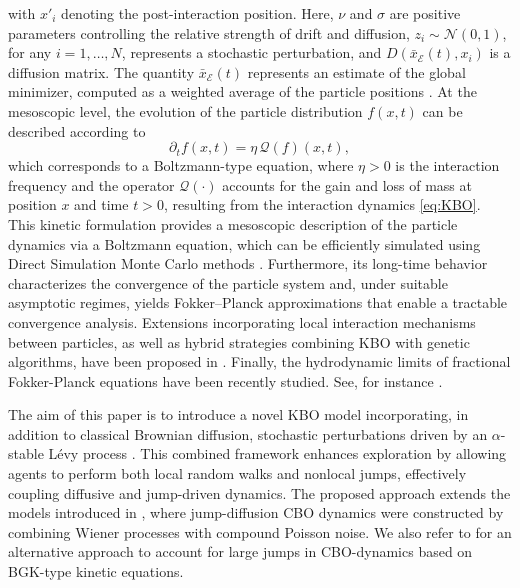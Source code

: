 \documentclass[11pt,handout]{article}%
\numberwithin{equation}{section}
\theoremstyle{definition}
\begin{document}
with $x'_i$ denoting the post-interaction position. Here, $\nu$ and $\sigma$ are positive parameters controlling the relative strength of drift and diffusion, $z_i \sim \mathcal{N}(0,1)$, for any $i=1,\ldots, N$, represents a stochastic perturbation, and $D(\bar{x}_{\mathcal{E}}(t), x_i)$ is a diffusion matrix. The quantity $\bar{x}_{\mathcal{E}}(t)$ represents an estimate of the global minimizer, computed as a weighted average of the particle positions \cite{PTTM2017}. At the mesoscopic level, the evolution of the particle distribution $f(x,t)$ can be described according to
\begin{equation}\label{eq:boltzmann_kbo}
	\partial_t f(x,t) = \eta \, \mathcal{Q}(f)(x,t),
\end{equation}
which corresponds to a Boltzmann-type equation, where $\eta>0$ is the interaction frequency and the operator $\mathcal{Q}(\cdot
)$ accounts for the gain and loss of mass at position $x$ and time $t>0$, resulting from the interaction dynamics \eqref{eq:KBO}.
This kinetic formulation provides a mesoscopic description of the particle dynamics via a Boltzmann equation, which can be efficiently simulated using Direct Simulation Monte Carlo methods \cite{pareschi2013interacting, nanbu1980direct, pareschi2001introduction}. Furthermore, its long-time behavior characterizes the convergence of the particle system and, under suitable asymptotic regimes, yields Fokker--Planck approximations that enable a tractable convergence analysis. Extensions incorporating local interaction mechanisms between particles, as well as hybrid strategies combining KBO with genetic algorithms, have been proposed in \cite{albi2023kinetic, benfenati2022binary}. Finally, the hydrodynamic limits of fractional Fokker-Planck equations have been recently studied. See, for instance \cite{pasCesbron2019}.

The aim of this paper is to introduce a novel KBO model incorporating, in addition to classical Brownian diffusion, stochastic perturbations driven by an $\alpha$-stable L\'evy process \cite{applebaum2009levy,ken1999levy,kyprianou2022stable,meerschaert2019stochastic}. This combined framework enhances exploration by allowing agents to perform both local random walks and nonlocal jumps, effectively coupling diffusive and jump-driven dynamics. The proposed approach extends the models introduced in \cite{kalise2023consensus}, where jump-diffusion CBO dynamics were constructed by combining Wiener processes with compound Poisson noise. We also refer to \cite{borghi2025swarm} for an alternative approach to account for large jumps in CBO-dynamics based on BGK-type kinetic equations.
\end{document}

